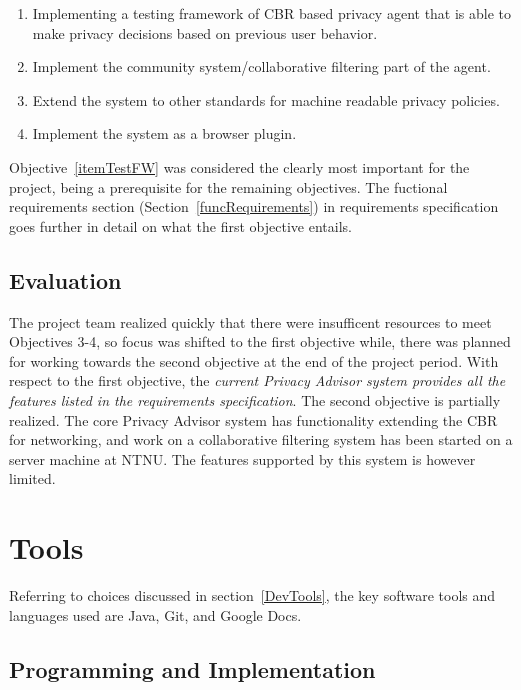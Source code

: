 \begin{enumerate}
\item\label{itemTestFW} Implementing a testing framework of CBR based privacy agent that is able to make privacy decisions based on previous user behavior.
\item\label{itemCollaborative} Implement the community system/collaborative filtering part of the agent.
\item\label{itemExtend} Extend the system to other standards for machine readable privacy policies.
\item\label{itemBrowser}Implement the system as a browser plugin. 
\end{enumerate}

Objective~\ref{itemTestFW} was considered the clearly most important for the project, being a prerequisite for the remaining objectives. The fuctional requirements section (Section~\ref{funcRequirements}) in requirements specification goes further in detail on what the first objective entails.

\subsection{Evaluation}
The project team realized quickly that there were insufficent resources to meet Objectives 3-4, so focus was shifted to the first objective while, there was planned for working towards the second objective at the end of the project period. With respect to the first objective, the \emph{current Privacy Advisor system provides all the features listed in the requirements specification}. The second objective is partially realized. The core Privacy Advisor system has functionality extending the CBR for networking, and work on a collaborative filtering system has been started on a server machine at NTNU. The features supported by this system is however limited.



\section{Tools}\label{toolseval}

Referring to choices discussed in section~\ref{DevTools}, the key
software tools and languages used are Java, Git, and Google
Docs. 

\subsection{Programming and Implementation}

